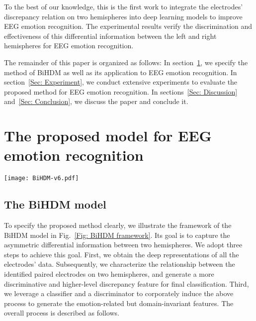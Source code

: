 \documentclass[journal]{IEEEtran}
\begin{document}
To the best of our knowledge, this is the first work to integrate the electrodes' discrepancy relation on two hemispheres into deep learning models to improve EEG emotion recognition. The experimental results verify the discrimination and effectiveness of this differential information between the left and right hemispheres for EEG emotion recognition.

The remainder of this paper is organized as follows: In section~\ref{Sec: The proposed method}, we specify the method of BiHDM as well as its application to EEG emotion recognition. In section~\ref{Sec: Experiment}, we conduct extensive experiments to evaluate the proposed method for EEG emotion recognition. In sections~\ref{Sec: Discussion} and~\ref{Sec: Conclusion}, we discuss the paper and conclude it.

\section{The proposed model for EEG emotion recognition}
\label{Sec: The proposed method}
\begin{figure*}[htb]
	\centering
	\texttt{[image: BiHDM-v6.pdf]} \\
	\caption{The framework of BiHDM. BiHDM consists of four RNN modules to capture each hemispheric EEG electrodes' information from horizontal and vertical streams. Then all the electrodes' data representations interact and construct the final vector for the classifier and discriminator.}
	\label{Fig: BiHDM framework}
\end{figure*}

\subsection{The BiHDM model}
To specify the proposed method clearly, we illustrate the framework of the BiHDM model in Fig.~\ref{Fig: BiHDM framework}. Its goal is to capture the asymmetric differential information between two hemispheres. We adopt three steps to achieve this goal. First, we obtain the deep representations of all the electrodes' data. Subsequently, we characterize the relationship between the identified paired electrodes on two hemispheres, and generate a more discriminative and higher-level discrepancy feature for final classification. Third, we leverage a classifier and a discriminator to corporately induce the above process to generate the emotion-related but domain-invariant features. The overall process is described as follows.
\end{document}

